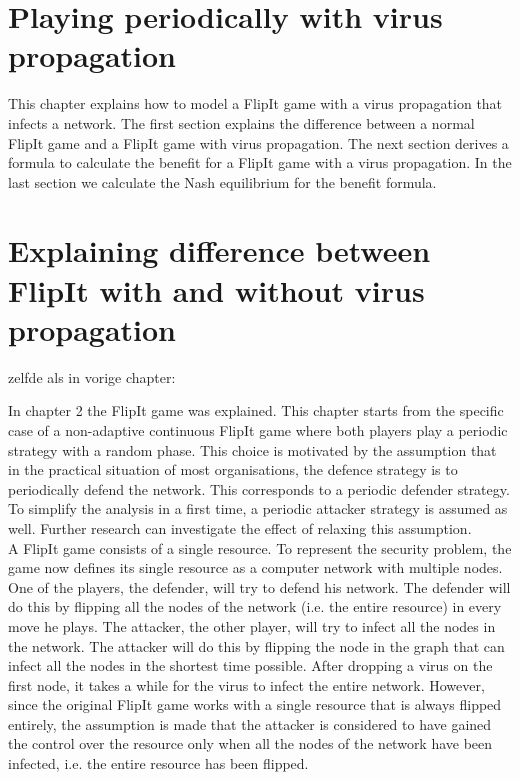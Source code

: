 \section*{Playing periodically with virus propagation}

This chapter explains how to model a FlipIt game with a virus propagation that infects a network. The first section explains the difference between a normal FlipIt game and a FlipIt game with virus propagation. The next section derives a formula to calculate the benefit for a FlipIt game with a virus propagation. In the last section we calculate the Nash equilibrium for the benefit formula.

\section{Explaining difference between FlipIt with and without virus propagation}
zelfde als in vorige chapter:

In chapter 2 the FlipIt game was explained.  This chapter starts from the specific case of a non-adaptive continuous FlipIt game where both players play a periodic strategy with a random phase. This choice is motivated by the assumption that in the practical situation of most organisations, the defence strategy is to periodically defend the network. This corresponds to a periodic defender strategy.  To simplify the analysis in a first time, a periodic attacker strategy is assumed as well. Further research can investigate the effect of relaxing this assumption.\\


A FlipIt game consists of a single resource. To represent the security problem, the game now defines its single resource as a computer network with multiple
nodes. One of the players, the defender, will try to defend his network. The defender
will do this by flipping all the nodes of the network (i.e. the entire resource) in every move he plays. The
attacker, the other player, will try to infect all the nodes in the network. The attacker
will do this by flipping the node in the graph that can infect all the nodes in the
shortest time possible. After dropping a virus on the first node, it takes a while for the virus to infect the entire network. However, since the original FlipIt game works with a single resource that is always flipped entirely, the assumption is made that the attacker is considered to have gained the control over the resource only when all the nodes of the network have been infected, i.e. the entire resource has been flipped.

